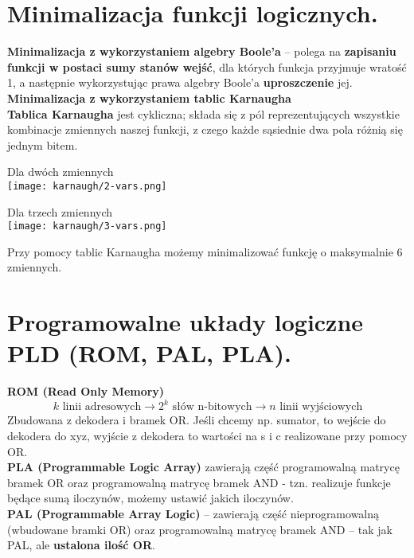 \documentclass[main.tex]{subfiles}
\begin{document}
    \section{Minimalizacja funkcji logicznych.}

    \textbf{Minimalizacja z wykorzystaniem algebry Boole'a} -- polega na \textbf{zapisaniu funkcji w postaci sumy stanów wejść},
    dla których funkcja przyjmuje wratość 1, a następnie wykorzystując prawa algebry Boole'a \textbf{uproszczenie} jej.\\

    \noindent \textbf{Minimalizacja z wykorzystaniem tablic Karnaugha}\\
    \textbf{Tablica Karnaugha} jest cykliczna; składa się z pól reprezentujących wszystkie kombinacje zmiennych naszej
    funkcji, z czego każde sąsiednie dwa pola różnią się jednym bitem.

    \begin{center}
        Dla dwóch zmiennych \\
        \texttt{[image: karnaugh/2-vars.png]}

        Dla trzech zmiennych \\
        \texttt{[image: karnaugh/3-vars.png]}
    \end{center}
    Przy pomocy tablic Karnaugha możemy minimalizować funkcję o maksymalnie 6 zmiennych.


    \section{Programowalne układy logiczne PLD (ROM, PAL, PLA).}

    \textbf{ROM (Read Only Memory)}
    \[ k \text{ linii adresowych} \rightarrow 2^k \text{ słów n-bitowych} \rightarrow n \text{ linii wyjściowych}\]
    Zbudowana z dekodera i bramek OR. Jeśli chcemy np. sumator, to wejście do dekodera do xyz, wyjście z dekodera
    to wartości na s i c realizowane przy pomocy OR.\\

    \noindent \textbf{PLA (Programmable Logic Array)} zawierają część programowalną matrycę bramek OR oraz programowalną
    matrycę bramek AND - tzn. realizuje funkcje będące sumą iloczynów, możemy ustawić jakich iloczynów.\\

    \noindent \textbf{PAL (Programmable Array Logic)} -- zawierają część nieprogramowalną (wbudowane bramki OR) oraz programowalną
    matrycę bramek AND -- tak jak PAL, ale \textbf{ustalona ilość OR}.
\end{document}
